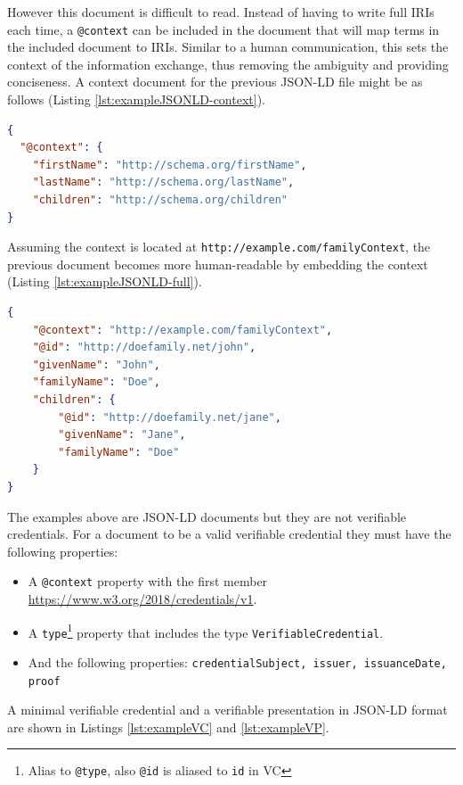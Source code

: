 However this document is difficult to read. Instead of having to write full \acrshort{IRI}s each time, a \lstinline{@context} can be included in the document that will map terms in the included document to \acrshort{IRI}s. Similar to a human communication, this sets the context of the information exchange, thus removing the ambiguity and providing conciseness. A context document for the previous \acrshort{JSON-LD} file might be as follows (Listing \ref{lst:exampleJSONLD-context}).

\begin{lstlisting}[language=json, label={lst:exampleJSONLD-context}, caption={A context file}]
{
  "@context": {
    "firstName": "http://schema.org/firstName",
    "lastName": "http://schema.org/lastName",
    "children": "http://schema.org/children"
}
\end{lstlisting}

Assuming the context is located at \lstinline{http://example.com/familyContext}, the previous document becomes more human-readable by embedding the context (Listing \ref{lst:exampleJSONLD-full}).

\begin{lstlisting}[language=json, label={lst:exampleJSONLD-full}, caption={A context added JSON-LD with shortened terms}]
{
    "@context": "http://example.com/familyContext",
    "@id": "http://doefamily.net/john",
    "givenName": "John",
    "familyName": "Doe",
    "children": {
        "@id": "http://doefamily.net/jane",
        "givenName": "Jane",
        "familyName": "Doe"
    }
}
\end{lstlisting}

The examples above are \acrshort{JSON-LD} documents but they are not verifiable credentials. For a document to be a valid verifiable credential they must have the following properties:
\begin{itemize}
    \item A \lstinline{@context} property with the first member \url{https://www.w3.org/2018/credentials/v1}.
    \item A \lstinline{type}\footnote{Alias to \lstinline{@type}, also \lstinline{@id} is aliased to \lstinline{id} in \acrshort{VC}} property that includes the type \lstinline{VerifiableCredential}.
    \item And the following properties: \lstinline{credentialSubject, issuer, issuanceDate, proof}
\end{itemize}

A minimal verifiable credential and a verifiable presentation in \acrshort{JSON-LD} format are shown in Listings \ref{lst:exampleVC} and \ref{lst:exampleVP}.

